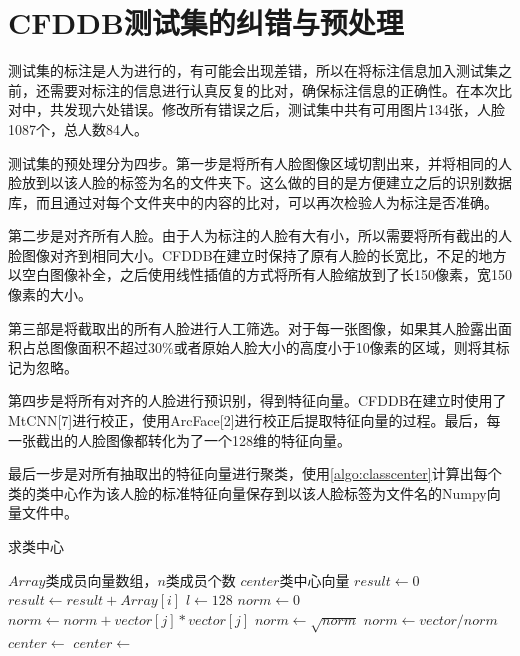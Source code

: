 \section{CFDDB测试集的纠错与预处理}

测试集的标注是人为进行的，有可能会出现差错，所以在将标注信息加入测试集之前，还需要对标注的信息进行认真反复的比对，确保标注信息的正确性。在本次比对中，共发现六处错误。修改所有错误之后，测试集中共有可用图片134张，人脸1087个，总人数84人。

测试集的预处理分为四步。第一步是将所有人脸图像区域切割出来，并将相同的人脸放到以该人脸的标签为名的文件夹下。这么做的目的是方便建立之后的识别数据库，而且通过对每个文件夹中的内容的比对，可以再次检验人为标注是否准确。

第二步是对齐所有人脸。由于人为标注的人脸有大有小，所以需要将所有截出的人脸图像对齐到相同大小。CFDDB在建立时保持了原有人脸的长宽比，不足的地方以空白图像补全，之后使用线性插值的方式将所有人脸缩放到了长150像素，宽150像素的大小。

第三部是将截取出的所有人脸进行人工筛选。对于每一张图像，如果其人脸露出面积占总图像面积不超过$30\%$或者原始人脸大小的高度小于10像素的区域，则将其标记为忽略。

第四步是将所有对齐的人脸进行预识别，得到特征向量。CFDDB在建立时使用了MtCNN[7]进行校正，使用ArcFace[2]进行校正后提取特征向量的过程。最后，每一张截出的人脸图像都转化为了一个128维的特征向量。

最后一步是对所有抽取出的特征向量进行聚类，使用\ref{algo:classcenter}计算出每个类的类中心作为该人脸的标准特征向量保存到以该人脸标签为文件名的Numpy向量文件中。

\begin{algorithm}
	\caption{求类中心}
	\label{algo:classcenter}
	\begin{algorithmic}[1] %
		\Require $Array$类成员向量数组，$n$类成员个数 %
		\Ensure $center$类中心向量 %
		\State $result \gets 0$
		\State $result \gets result + Array[i]$
		\EndFor
		\State {}
		\EndFunction
		\State %
		\State $l\gets 128$
		\State $norm\gets 0$
		\State $norm\gets norm + vector[j] * vector[j]$
		\EndFor
		\State $norm\gets \sqrt{norm}$
		\State $norm\gets vector / norm$
		\State {}
		\EndFunction
		\State
		\State $center\gets $
		\State $center\gets $
		\State {}
		\EndFunction
	\end{algorithmic}
\end{algorithm}


